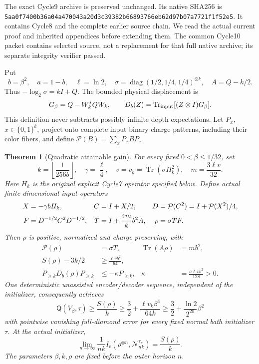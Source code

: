 \documentclass[11pt]{article}
\newtheorem{theorem}{Theorem}[section]
\newcommand{\Tr}{\operatorname{Tr}}
\newcommand{\Ic}{I_{\mathrm c}}
\newcommand{\Qcap}{\mathsf Q}
\newcommand{\pin}{\mathcal P}
\begin{document}
The exact Cycle9 archive is preserved unchanged. Its native SHA256 is
\texttt{5aa0f7400b36a04a470043a20d3c39382b66893766eb62d97b07a7721f1f52e5}.
It contains Cycle8 and the complete earlier source chain. We read the
actual current proof and inherited appendices before extending them.
The common Cycle10 packet contains selected source, not a replacement
for that full native archive; its separate integrity verifier passed.

Put
\[
 b=\beta^2,\quad a=1-b,\quad \ell=\ln2,\quad
 \sigma=\operatorname{diag}(1/2,1/4,1/4)^{\otimes k},\quad
 A=Q-k/2.
\]
Thus \(-\log_2\sigma=kI+Q\). The bounded physical displacement is
\[
 G_\beta=Q-W_k^*QW_k,\qquad
 D_b(Z)=\Tr_{\rm input}[(Z\otimes I)G_\beta].
\]
This definition never subtracts possibly infinite depth expectations.
Let \(P_x\), \(x\in\{0,1\}^k\), project onto complete input binary
charge patterns, including their color fibers, and define
\(\pin(B)=\sum_xP_xBP_x\).

\begin{theorem}[Quadratic attainable gain]\label{thm:quadratic}
For every fixed \(0<\beta\le1/32\), set
\[
 k=\left\lfloor\frac1{256b}\right\rfloor,\quad
 \gamma=\frac\ell4,\quad v=v_k=\Tr(\sigma H_k^2),\quad
 m=\frac{3\ell v}{32}.
\]
Here \(H_k\) is the original explicit Cycle7 operator specified below.
Define actual finite-dimensional input operators
\begin{align}
 X&=-\gamma bH_k,& C&=I+X/2,& D&=\pin(C^2)=I+\pin(X^2)/4,\notag\\
 F&=D^{-1/2}C^2D^{-1/2},&
 T&=I+\frac{4m}{k}b^2A,&
 \rho&=\sigma TF.\label{eq:newinput}
\end{align}
Then \(\rho\) is positive, normalized and charge preserving, with
\begin{align}
 \pin(\rho)&=\sigma T,&\Tr(A\rho)&=mb^2,\label{eq:exactcharge}\\
 S(\rho)-3k/2&\ge\frac{\ell vb^2}{64},\label{eq:entropyfloor}\\
 P_{\ge k}D_b(\rho)P_{\ge k}
 &\le-\kappa P_{\ge k},&
 \kappa&=\frac{a\ell vb^2}{128}>0.\label{eq:exactdrift}
\end{align}
One deterministic unassisted encoder/decoder sequence, independent of the
initializer, consequently achieves
\begin{equation}\label{eq:quadraticrate}
 \Qcap(V_\beta,\tau)\ge\frac{S(\rho)}k
 \ge\frac32+\frac{\ell v_k\beta^4}{64k}
 \ge\frac32+\frac{\ln2}{2^{20}}\beta^2
\end{equation}
with pointwise vanishing full-diamond error for every fixed normal bath
initializer \(\tau\). At the actual initializer,
\[
 \lim_{n\to\infty}\frac1{nk}
 \Ic(\rho^{\otimes n},\mathcal N_{nk}^{\tau_\pi})=\frac{S(\rho)}k.
\]
The parameters \(\beta,k,\rho\) are fixed before the outer horizon \(n\).
\end{theorem}
\end{document}
